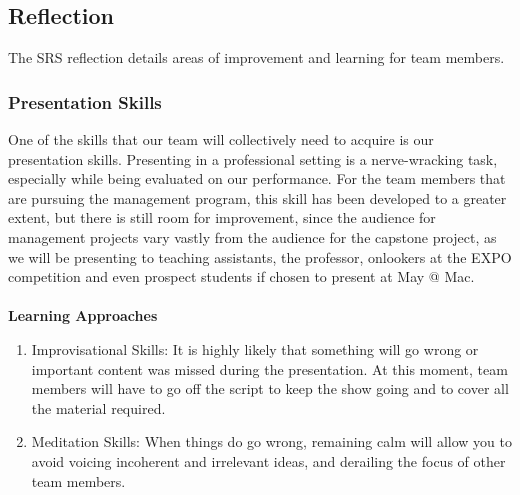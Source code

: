 \documentclass[12pt,letterpaper]{article}
\begin{document}
\subsection{Reflection}
The SRS reflection details areas of improvement and learning for team members.
\label{reflection}
\subsubsection{Presentation Skills}
One of the skills that our team will collectively need to acquire is our
presentation skills. Presenting in a professional setting is a nerve-wracking
task, especially while being evaluated on our performance. For the team members
that are pursuing the management program, this skill has been developed to a
greater extent, but there is still room for improvement, since the audience for
management projects vary vastly from the audience for the capstone project, as
we will be presenting to teaching assistants, the professor, onlookers at the
EXPO competition and even prospect students if chosen to present at May @ Mac.
\\
\\
\noindent \textbf{Learning Approaches}
\begin{enumerate}
    \item Improvisational Skills: It is highly likely that something will go
    wrong or important content was missed during the presentation. At this
    moment, team members will have to go off the script to keep the show going
    and to cover all the material required. 
    \item Meditation Skills: When things do go wrong, remaining calm will allow
    you to avoid voicing incoherent and irrelevant ideas, and derailing the
    focus of other team members.
\end{enumerate}
\end{document}
